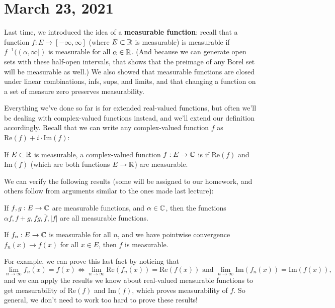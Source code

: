 \pagebreak\section{March 23, 2021}

Last time, we introduced the idea of a \textbf{measurable function}: recall that a function $f: E \to [-\infty, \infty]$ (where $E \subset \mathbb R$ is measurable) is measurable if $f^{-1}((\alpha, \infty])$ is measurable for all $\alpha \in \mathbb R$. (And because we can generate open sets with these half-open intervals, that shows that the preimage of any Borel set will be measurable as well.) We also showed that measurable functions are closed under linear combinations, infs, sups, and limits, and that changing a function on a set of measure zero preserves measurability.

Everything we've done so far is for extended real-valued functions, but often we'll be dealing with complex-valued functions instead, and we'll extend our definition accordingly. Recall that we can write any complex-valued function $f$ as $\text{Re}(f) + i \cdot \text{Im}(f)$:

\begin{definition}
If $E \subset \mathbb R$ is measurable, a complex-valued function $f: E \to \mathbb C$ is  if $\text{Re}(f)$ and $\text{Im}(f)$ (which are both functions $E \to \mathbb R$) are measurable.
\end{definition}

We can verify the following results (some will be assigned to our homework, and others follow from arguments similar to the ones made last lecture):

\begin{theorem}\label{compmeaslincomb}
If $f, g: E \to \mathbb C$ are measurable functions, and $\alpha \in \mathbb C$, then the functions $\alpha f, f + g, fg, \overline{f}, |f|$ are all measurable functions.
\end{theorem}

\begin{theorem}
If $f_n: E \to \mathbb C$ is measurable for all $n$, and we have pointwise convergence $f_n(x) \to f(x)$ for all $x \in E$, then $f$ is measurable.
\end{theorem}

For example, we can prove this last fact by noticing that 
\[
    \lim_{n \to \infty} f_n(x) = f(x) \iff \lim_{n \to \infty} \text{Re}(f_n(x)) = \text{Re}(f(x)) \text{ and } \lim_{n \to \infty} \text{Im}(f_n(x)) = \text{Im}(f(x)),
\]  
and we can apply the results we know about real-valued measurable functions to get measurability of $\text{Re}(f)$ and $\text{Im}(f)$, which proves measurability of $f$. So general, we don't need to work too hard to prove these results!

